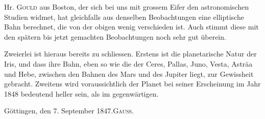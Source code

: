 Hr. \textsc{Gould} aus Boston, der sich bei uns mit grossem Eifer den astronomischen Studien widmet, hat gleichfalls aus denselben Beobachtungen eine elliptische Bahn berechnet, die von der obigen wenig verschieden ist. Auch stimmt diese mit den spätern bis jetzt gemachten Beobachtungen noch sehr gut überein.

Zweierlei ist hieraus bereits zu schliessen. Erstens ist die planetarische Natur der Iris, und dass ihre Bahn, eben so wie die der Ceres, Pallas, Juno, Vesta, Asträa und Hebe, zwischen den Bahnen des Mars und des Jupiter liegt, zur Gewissheit gebracht. Zweitens wird voraussichtlich der Planet bei seiner Erscheinung im Jahr 1848 bedeutend heller sein, als im gegenwärtigen.

\noindent Göttingen, den 7. September 1847.\hfill\textsc{Gauss}.
